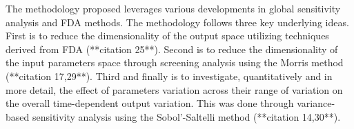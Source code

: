 The methodology proposed leverages various developments in global sensitivity analysis and FDA methods. 
The methodology follows three key underlying ideas. 
First is to reduce the dimensionality of the output space utilizing techniques derived from FDA (**citation 25**). 
Second is to reduce the dimensionality of the input parameters space through screening analysis using the Morris method (**citation 17,29**). 
Third and finally is to investigate, quantitatively and in more detail, the effect of parameters variation across their range of variation on the overall time-dependent output variation. 
This was done through variance-based sensitivity analysis using the Sobol’-Saltelli method (**citation 14,30**). 









